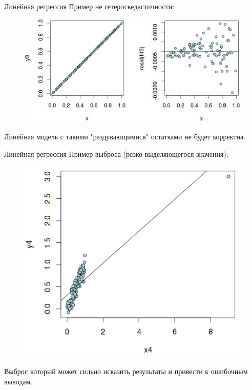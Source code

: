 \documentclass{beamer}
\begin{document}
\begin{frame}{Линейная регрессия}
Пример не гетероскедастичности:
\begin{figure}[h]
\centering
\includegraphics[scale=0.5]{images/error-03.png}
\end{figure}
Линейная модель с такими "раздувающимися" остатками не будет корректна. 
\end{frame}

\begin{frame}{Линейная регрессия}
Пример выброса (резко выделяющегося значения):
\begin{figure}[h]
\centering
\includegraphics[scale=0.4]{images/error-04.png}
\end{figure}
Выброс который может сильно исказить результаты и привести к ошибочным выводам.
\end{frame}
\end{document}
